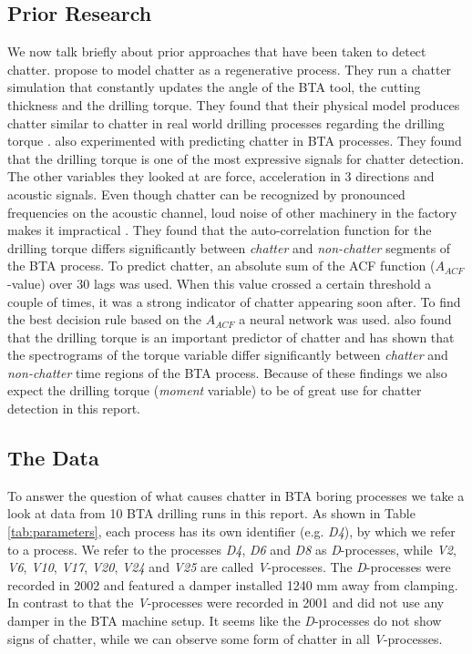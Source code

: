 \documentclass[12 pt]{scrartcl}
\begin{document}
\subsection{Prior Research}

We now talk briefly about prior approaches that have been taken to detect chatter. \citet{raabe2010dynamic} propose to model chatter as a regenerative process. They run a chatter simulation that constantly updates the angle of the BTA tool, the cutting thickness and the drilling torque. They found that their physical model produces chatter similar to chatter in real world drilling processes regarding the drilling torque \citep[p.~748]{raabe2010dynamic}.
\citet{weinert2001statistics} also experimented with predicting chatter in BTA processes. They found that the drilling torque is one of the most expressive signals for chatter detection. The other variables they looked at are force, acceleration in 3 directions and acoustic signals. Even though chatter can be recognized by pronounced frequencies on the acoustic channel, loud noise of other machinery in the factory makes it impractical \citep[p.~6]{weinert2001statistics}. They found that the auto-correlation function for the drilling torque differs significantly between \emph{chatter} and \emph{non-chatter} segments of the BTA process.
To predict chatter, an absolute sum of the ACF function ($A_{ACF}$-value) over 30 lags was used. When this value crossed a certain threshold a couple of times, it was a strong indicator of chatter appearing soon after. To find the best decision rule based on the $A_{ACF}$ a neural network was used.
\citet[p.~27]{theis2004modelling} also found that the drilling torque is an important predictor of chatter and has shown that the spectrograms of the torque variable differ significantly between \emph{chatter} and \emph{non-chatter} time regions of the BTA process.
Because of these findings we also expect the drilling torque (\emph{moment} variable) to be of great use for chatter detection in this report.

\subsection{The Data}

To answer the question of what causes chatter in BTA boring processes we take a look at data from 10 BTA drilling runs in this report.
As shown in Table \ref{tab:parameters}, each process has its own identifier (e.g. \emph{D4}), by which we refer to a process.
We refer to the processes \emph{D4}, \emph{D6} and \emph{D8} as \emph{D}-processes, while \emph{V2}, \emph{V6}, \emph{V10}, \emph{V17}, \emph{V20}, \emph{V24} and \emph{V25} are called \emph{V}-processes.
The \emph{D}-processes were recorded in 2002 and featured a damper installed 1240 mm away from clamping. In contrast to that the \emph{V}-processes were recorded in 2001 and did not use any damper in the BTA machine setup. It seems like the \emph{D}-processes do not show signs of chatter, while we can observe some form of chatter in all \emph{V}-processes.
\end{document}
